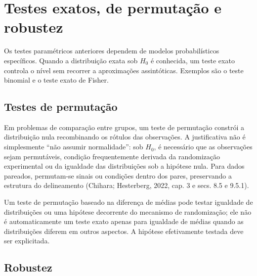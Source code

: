 \documentclass[
  letterpaper,
  DIV=11,
  numbers=noendperiod]{scrreprt}
\begin{document}
\section{Testes exatos, de permutação e
robustez}\label{testes-exatos-de-permutauxe7uxe3o-e-robustez}

Os testes paramétricos anteriores dependem de modelos probabilísticos
específicos. Quando a distribuição exata sob \(H_0\) é conhecida, um
teste exato controla o nível sem recorrer a aproximações assintóticas.
Exemplos são o teste binomial e o teste exato de Fisher.

\subsection{Testes de permutação}\label{testes-de-permutauxe7uxe3o}

Em problemas de comparação entre grupos, um teste de permutação constrói
a distribuição nula recombinando os rótulos das observações. A
justificativa não é simplesmente ``não assumir normalidade'': sob
\(H_0\), é necessário que as observações sejam permutáveis, condição
frequentemente derivada da randomização experimental ou da igualdade das
distribuições sob a hipótese nula. Para dados pareados, permutam-se
sinais ou condições dentro dos pares, preservando a estrutura do
delineamento (Chihara; Hesterberg, 2022, cap. 3 e secs. 8.5 e 9.5.1).

\begin{tcolorbox}[enhanced jigsaw, colback=white, leftrule=.75mm, colbacktitle=quarto-callout-warning-color!10!white, breakable, titlerule=0mm, bottomtitle=1mm, title=\textcolor{quarto-callout-warning-color}{\faExclamationTriangle}\hspace{0.5em}{Observação}, colframe=quarto-callout-warning-color-frame, toprule=.15mm, opacityback=0, bottomrule=.15mm, opacitybacktitle=0.6, arc=.35mm, toptitle=1mm, rightrule=.15mm, coltitle=black, left=2mm]

Um teste de permutação baseado na diferença de médias pode testar
igualdade de distribuições ou uma hipótese decorrente do mecanismo de
randomização; ele não é automaticamente um teste exato apenas para
igualdade de médias quando as distribuições diferem em outros aspectos.
A hipótese efetivamente testada deve ser explicitada.

\end{tcolorbox}

\subsection{Robustez}\label{robustez}
\end{document}
